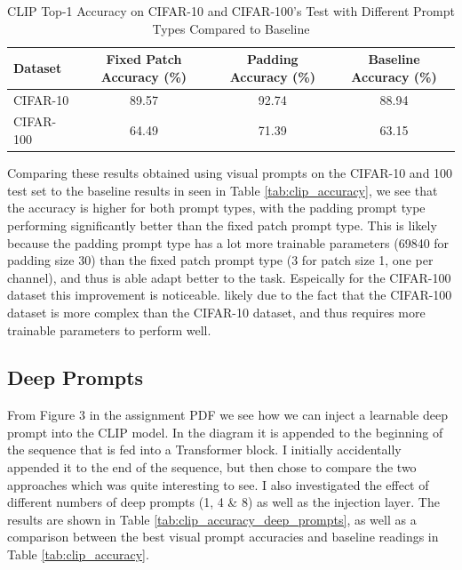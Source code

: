 \documentclass[a4paper]{article}
\begin{document}
\begin{table}[h]
    \centering
    \begin{tabular}{|l|c|c||c|}
    \hline
    \rowcolor{Gray}
    \textbf{Dataset} & \textbf{Fixed Patch Accuracy (\%)} & \textbf{Padding Accuracy (\%)} & \textbf{Baseline Accuracy (\%)} \\ \hline
    CIFAR-10 & 89.57 & 92.74 & 88.94 \\ \hline
    CIFAR-100 & 64.49 & 71.39 & 63.15 \\ \hline
    \end{tabular}
    \caption{CLIP Top-1 Accuracy on CIFAR-10 and CIFAR-100's Test with Different Prompt Types Compared to Baseline}
    \label{tab:clip_accuracy_prompt_types}
\end{table}

Comparing these results obtained using visual prompts on the CIFAR-10 and 100 test set to the baseline results in
seen in Table \ref{tab:clip_accuracy}, we see that the accuracy is higher for both prompt types, with the padding
prompt type performing significantly better than the fixed patch prompt type. This is likely because the padding
prompt type has a lot more trainable parameters (69840 for padding size 30) than the fixed patch prompt type (3 for
patch size 1, one per channel), and thus is able adapt better to the task. Espeically for the CIFAR-100 dataset this
improvement is noticeable. likely due to the fact that the CIFAR-100 dataset is more complex than the CIFAR-10
dataset, and thus requires more trainable parameters to perform well.
\bigskip

\subsection{Deep Prompts}
From Figure 3 in the assignment PDF we see how we can inject a learnable deep prompt into the CLIP model. In the
diagram it is appended to the beginning of the sequence that is fed into a Transformer block. I initially accidentally
appended it to the end of the sequence, but then chose to compare the two approaches which was quite interesting to
see. I also investigated the effect of different numbers of deep prompts (1, 4 \& 8) as well as the injection layer.
The results are shown in Table \ref{tab:clip_accuracy_deep_prompts}, as well as a comparison between the best visual
prompt accuracies and baseline readings in Table \ref{tab:clip_accuracy}.
\end{document}
